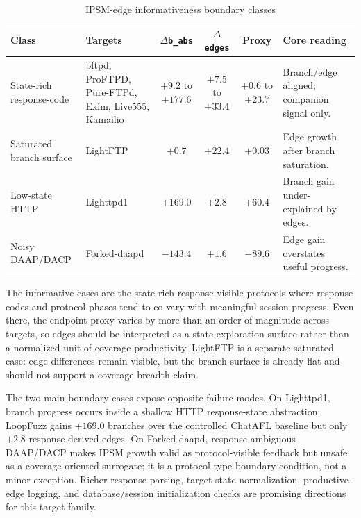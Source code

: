 \documentclass[final,5p,times,number]{elsarticle}
\begin{document}
\begin{table}[!t]
\centering
\caption{IPSM-edge informativeness boundary classes}
\label{tab:edge_productivity_boundary}
{\scriptsize
\setlength{\tabcolsep}{3.0pt}
\renewcommand{\arraystretch}{1.05}
\begin{tabularx}{\textwidth}{>{\raggedright\arraybackslash}p{}
                              >{\raggedright\arraybackslash}p{}
                              c c c X}
\toprule
Class & Targets & $\Delta$\texttt{b\_abs} & $\Delta$\texttt{edges} & Proxy & Core reading \\
\midrule
State-rich response-code & bftpd, ProFTPD, Pure-FTPd, Exim, Live555, Kamailio & $+9.2$ to $+177.6$ & $+7.5$ to $+33.4$ & $+0.6$ to $+23.7$ & Branch/edge aligned; companion signal only. \\
\midrule
Saturated branch surface & LightFTP & $+0.7$ & $+22.4$ & $+0.03$ & Edge growth after branch saturation. \\
\midrule
Low-state HTTP & Lighttpd1 & $+169.0$ & $+2.8$ & $+60.4$ & Branch gain under-explained by edges. \\
\midrule
Noisy DAAP/DACP & Forked-daapd & $-143.4$ & $+1.6$ & $-89.6$ & Edge gain overstates useful progress. \\
\bottomrule
\end{tabularx}
}
\end{table}

The informative cases are the state-rich response-visible protocols where response codes and protocol phases tend to co-vary with meaningful session progress. Even there, the endpoint proxy varies by more than an order of magnitude across targets, so edges should be interpreted as a state-exploration surface rather than a normalized unit of coverage productivity. LightFTP is a separate saturated case: edge differences remain visible, but the branch surface is already flat and should not support a coverage-breadth claim.

The two main boundary cases expose opposite failure modes. On Lighttpd1, branch progress occurs inside a shallow HTTP response-state abstraction: LoopFuzz gains $+169.0$ branches over the controlled ChatAFL baseline but only $+2.8$ response-derived edges. On Forked-daapd, response-ambiguous DAAP/DACP makes IPSM growth valid as protocol-visible feedback but unsafe as a coverage-oriented surrogate; it is a protocol-type boundary condition, not a minor exception. Richer response parsing, target-state normalization, productive-edge logging, and database/session initialization checks are promising directions for this target family.
\end{document}
